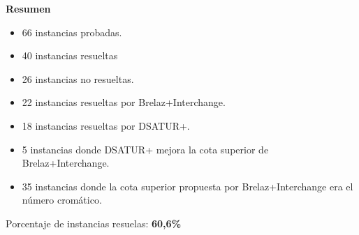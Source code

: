 \documentclass[a4paper,10pt]{article}
\begin{document}
\textbf{Resumen}
\begin{itemize}
 \item 66 instancias probadas.
 \item 40 instancias resueltas
 \item 26 instancias no resueltas.
 \item 22 instancias resueltas por Brelaz+Interchange.
 \item 18 instancias resueltas por DSATUR+.
 \item 5 instancias donde DSATUR+ mejora la cota superior de
       Brelaz+Interchange.
 \item 35 instancias donde la cota superior propuesta por
       Brelaz+Interchange era el n\'umero crom\'atico.
\end{itemize}
\indent Porcentaje de instancias resuelas: \textbf{60,6\%}
\end{document}
